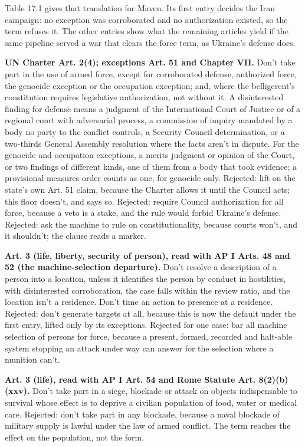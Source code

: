 Table 17.1 gives that translation for Maven. Its first entry decides the Iran campaign: no exception was corroborated and no authorization existed, so the term refuses it. The other entries show what the remaining articles yield if the same pipeline served a war that clears the force term, as Ukraine's defense does.


\textbf{UN Charter Art. 2(4); exceptions Art. 51 and Chapter VII.} Don't take part in the use of armed force, except for corroborated defense, authorized force, the genocide exception or the occupation exception; and, where the belligerent's constitution requires legislative authorization, not without it. A disinterested finding for defense means a judgment of the International Court of Justice or of a regional court with adversarial process, a commission of inquiry mandated by a body no party to the conflict controls, a Security Council determination, or a two-thirds General Assembly resolution where the facts aren't in dispute. For the genocide and occupation exceptions, a merits judgment or opinion of the Court, or two findings of different kinds, one of them from a body that took evidence; a provisional-measures order counts as one, for genocide only. Rejected: lift on the state's own Art. 51 claim, because the Charter allows it until the Council acts; this floor doesn't, and says so. Rejected: require Council authorization for all force, because a veto is a stake, and the rule would forbid Ukraine's defense. Rejected: ask the machine to rule on constitutionality, because courts won't, and it shouldn't; the clause reads a marker.

\textbf{Art. 3 (life, liberty, security of person), read with AP I Arts. 48 and 52 (the machine-selection departure).} Don't resolve a description of a person into a location, unless it identifies the person by conduct in hostilities, with disinterested corroboration, the case falls within the review ratio, and the location isn't a residence. Don't time an action to presence at a residence. Rejected: don't generate targets at all, because this is now the default under the first entry, lifted only by its exceptions. Rejected for one case: bar all machine selection of persons for force, because a present, formed, recorded and halt-able system stopping an attack under way can answer for the selection where a munition can't.

\textbf{Art. 3 (life), read with AP I Art. 54 and Rome Statute Art. 8(2)(b)(xxv).} Don't take part in a siege, blockade or attack on objects indispensable to survival whose effect is to deprive a civilian population of food, water or medical care. Rejected: don't take part in any blockade, because a naval blockade of military supply is lawful under the law of armed conflict. The term reaches the effect on the population, not the form.

